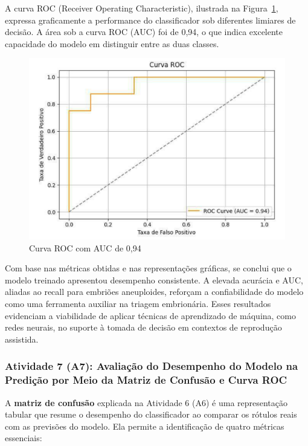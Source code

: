 A curva ROC (Receiver Operating Characteristic), ilustrada na Figura~\ref{fig:curvaRoc}, expressa graficamente a performance do classificador sob diferentes limiares de decisão. A área sob a curva ROC (AUC) foi de 0,94, o que indica excelente capacidade do modelo em distinguir entre as duas classes.

\begin{figure}[h]
    \captionsetup{font=footnotesize, justification=centering, labelsep=period, position=above}
    \centering
    \includegraphics[scale=0.4]{figuras/IA/curvaRoc.pdf}
    \caption{Curva ROC com AUC de 0,94}
    \label{fig:curvaRoc}
\end{figure}
\FloatBarrier

Com base nas métricas obtidas e nas representações gráficas, se conclui que o modelo treinado apresentou desempenho consistente. A elevada acurácia e AUC, aliadas ao recall para embriões aneuploides, reforçam a confiabilidade do modelo como uma ferramenta auxiliar na triagem embrionária. Esses resultados evidenciam a viabilidade de aplicar técnicas de aprendizado de máquina, como redes neurais, no suporte à tomada de decisão em contextos de reprodução assistida.

\subsubsection{Atividade 7 (A7): Avaliação do Desempenho do Modelo na Predição por Meio da Matriz de Confusão e Curva ROC}
A \textbf{matriz de confusão} explicada na Atividade 6 (A6) é uma representação tabular que resume o desempenho do classificador ao comparar os rótulos reais com as previsões do modelo. Ela permite a identificação de quatro métricas essenciais:

